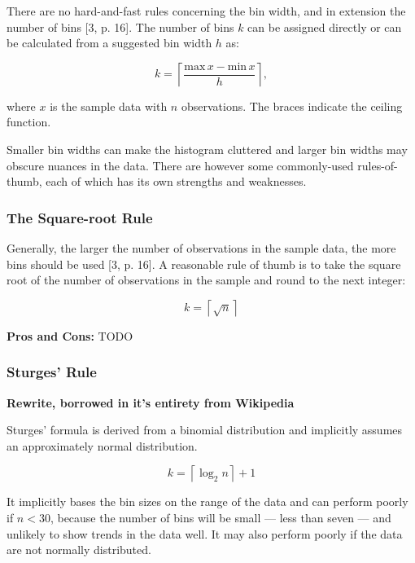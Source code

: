 There are no hard-and-fast rules concerning the bin width, and in extension the number of bins [3, p. 16]. The number of bins $k$ can be assigned directly or can be calculated from a suggested bin width $h$ as:

\begin{equation}
    k = \left \lceil \frac{\mathrm{max}\, x - \mathrm{min}\, x}{h} \right \rceil, 
\end{equation}

where $x$ is the sample data with $n$ observations. The braces indicate the ceiling function.

Smaller bin widths can make the histogram cluttered and larger bin widths may obscure nuances in the data. There are however some commonly-used rules-of-thumb, each of which has its own strengths and weaknesses. 

\subsubsection{The Square-root Rule}

Generally, the larger the number of observations in the sample data, the more bins should be used [3, p. 16]. A reasonable rule of thumb is to take the square root of the number of observations in the sample and round to the next integer:

\begin{equation}
    k = \left \lceil \sqrt{n} \right \rceil 
\end{equation}

\textbf{Pros and Cons:} TODO

\subsubsection{Sturges' Rule}

\textbf{Rewrite, borrowed in it's entirety from Wikipedia}

Sturges' formula is derived from a binomial distribution and implicitly assumes an approximately normal distribution.

\begin{equation}
    k = \left \lceil \log_2 n \right \rceil + 1 
\end{equation}

It implicitly bases the bin sizes on the range of the data and can perform poorly if $n < 30$, because the number of bins will be small — less than seven — and unlikely to show trends in the data well. It may also perform poorly if the data are not normally distributed.

